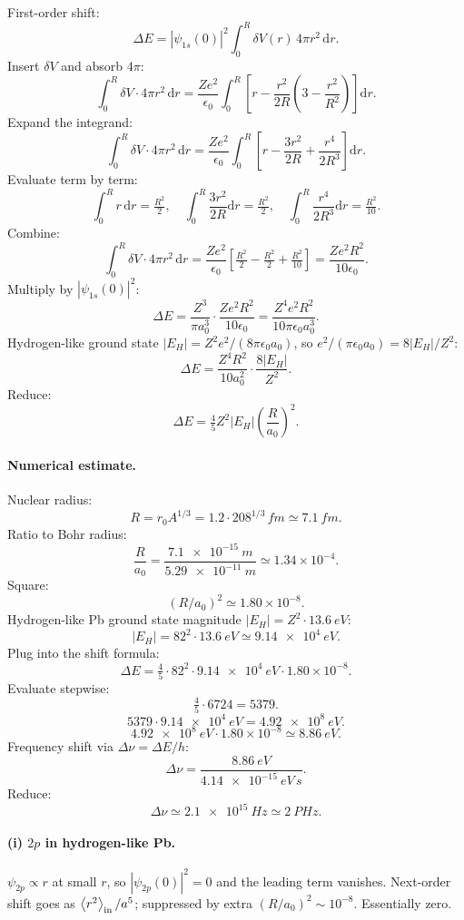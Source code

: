 \documentclass[11pt]{article}
\newcommand{\de}{\mathrm{d}}
\begin{document}
First-order shift:
\[
\Delta E=|\psi_{1s}(0)|^2\!\int_0^R\!\delta V(r)\,4\pi r^2\,\de r.
\]
Insert $\delta V$ and absorb $4\pi$:
\[
\int_0^R\!\delta V\cdot 4\pi r^2\,\de r=\frac{Ze^2}{\epsilon_0}\!\int_0^R\!\!\left[r-\frac{r^2}{2R}\!\left(3-\frac{r^2}{R^2}\right)\right]\de r.
\]
Expand the integrand:
\[
\int_0^R\!\delta V\cdot 4\pi r^2\,\de r=\frac{Ze^2}{\epsilon_0}\!\int_0^R\!\!\left[r-\frac{3r^2}{2R}+\frac{r^4}{2R^3}\right]\de r.
\]
Evaluate term by term:
\[
\int_0^R r\,\de r=\tfrac{R^2}{2},\quad\int_0^R\frac{3r^2}{2R}\de r=\tfrac{R^2}{2},\quad\int_0^R\frac{r^4}{2R^3}\de r=\tfrac{R^2}{10}.
\]
Combine:
\[
\int_0^R\!\delta V\cdot 4\pi r^2\,\de r=\frac{Ze^2}{\epsilon_0}\!\left[\tfrac{R^2}{2}-\tfrac{R^2}{2}+\tfrac{R^2}{10}\right]=\frac{Ze^2 R^2}{10\epsilon_0}.
\]
Multiply by $|\psi_{1s}(0)|^2$:
\[
\Delta E=\frac{Z^3}{\pi a_0^3}\cdot\frac{Ze^2 R^2}{10\epsilon_0}=\frac{Z^4 e^2 R^2}{10\pi\epsilon_0 a_0^3}.
\]
Hydrogen-like ground state $|E_H|=Z^2 e^2/(8\pi\epsilon_0 a_0)$, so $e^2/(\pi\epsilon_0 a_0)=8|E_H|/Z^2$:
\[
\Delta E=\frac{Z^4 R^2}{10 a_0^2}\cdot\frac{8|E_H|}{Z^2}.
\]
Reduce:
\begin{equation}
\boxed{\;\Delta E=\tfrac{4}{5}Z^2|E_H|\!\left(\frac{R}{a_0}\right)^2.\;}
\label{eq:finiteR}
\end{equation}

\paragraph{Numerical estimate.} Nuclear radius:
\[
R=r_0 A^{1/3}=1.2\cdot 208^{1/3}\,\si{fm}\simeq\SI{7.1}{fm}.
\]
Ratio to Bohr radius:
\[
\frac{R}{a_0}=\frac{\SI{7.1e-15}{m}}{\SI{5.29e-11}{m}}\simeq 1.34\times 10^{-4}.
\]
Square:
\[
(R/a_0)^2\simeq 1.80\times 10^{-8}.
\]
Hydrogen-like Pb ground state magnitude $|E_H|=Z^2\cdot\SI{13.6}{eV}$:
\[
|E_H|=82^2\cdot\SI{13.6}{eV}\simeq\SI{9.14e4}{eV}.
\]
Plug into the shift formula:
\[
\Delta E=\tfrac{4}{5}\cdot 82^2\cdot\SI{9.14e4}{eV}\cdot 1.80\!\times\!10^{-8}.
\]
Evaluate stepwise:
\[
\tfrac{4}{5}\cdot 6724=5379.
\]
\[
5379\cdot\SI{9.14e4}{eV}=\SI{4.92e8}{eV}.
\]
\[
\SI{4.92e8}{eV}\cdot 1.80\!\times\!10^{-8}\simeq\SI{8.86}{eV}.
\]
Frequency shift via $\Delta\nu=\Delta E/h$:
\[
\Delta\nu=\frac{\SI{8.86}{eV}}{\SI{4.14e-15}{eV\,s}}.
\]
Reduce:
\begin{equation}
\boxed{\;\Delta\nu\simeq\SI{2.1e15}{Hz}\simeq\SI{2}{PHz}.\;}
\label{eq:Pb-num}
\end{equation}

\paragraph{(i) $2p$ in hydrogen-like Pb.} $\psi_{2p}\propto r$ at small $r$, so $|\psi_{2p}(0)|^2=0$ and the leading term vanishes. Next-order shift goes as $\Braket{r^2}_{\rm in}/a^5$; suppressed by extra $(R/a_0)^2\sim 10^{-8}$. Essentially zero.
\end{document}
